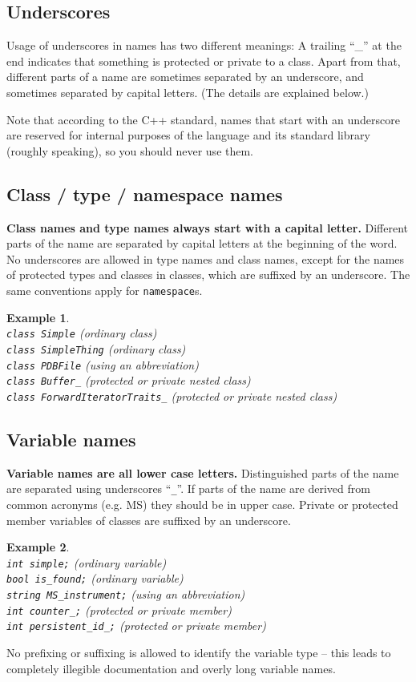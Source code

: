 \documentclass[a4]{article}
\newtheorem{example}{Example}
\begin{document}
\subsection{Underscores}

Usage of underscores in names has two different meanings: A trailing ``\_'' at
the end indicates that something is protected or private to a class.  Apart
from that, different parts of a name are sometimes separated by an underscore,
and sometimes separated by capital letters.  (The details are explained below.)

Note that according to the C++ standard, names that start with an underscore
are reserved for internal purposes of the language and its standard library
(roughly speaking), so you should never use them.


\subsection{Class / type / namespace names}

\textbf{Class names and type names always start with a capital letter.}
Different parts of the name are separated by capital letters at the beginning
of the word. No underscores are allowed in type names and class names, except
for the names of protected types and classes in classes, which are suffixed by
an underscore.  The same conventions apply for \texttt{namespace}s.
\begin{example}~\\
  {\tt class Simple} (ordinary class)\\
  {\tt class SimpleThing} (ordinary class)\\
  {\tt class PDBFile} (using an abbreviation)\\
  {\tt class Buffer\_} (protected or private nested class)\\
  {\tt class ForwardIteratorTraits\_} (protected or private nested class)
\end{example}


\subsection{Variable names}

\textbf{Variable names are all lower case letters.}  Distinguished parts of
the name are separated using underscores ``{\tt \_}''. If parts of the name
are derived from common acronyms (e.g. MS) they should be in upper case.
Private or protected member variables of classes are suffixed by an
underscore.
\begin{example}~\\
  {\tt int simple;} (ordinary variable)\\
  {\tt bool is\_found;} (ordinary variable)\\
  {\tt string MS\_instrument;} (using an abbreviation)\\
  {\tt int counter\_;} (protected or private member)\\
  {\tt int persistent\_id\_;} (protected or private member)
\end{example}
No prefixing or suffixing is allowed to identify the variable type -- this
leads to completely illegible documentation and overly long variable names.
\end{document}
